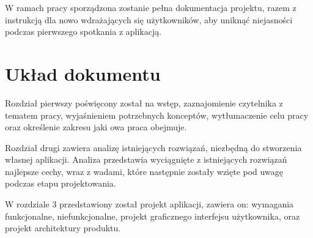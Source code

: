 W ramach pracy sporządzona zostanie pełna dokumentacja projektu, razem z instrukcją dla nowo wdrażających się użytkowników, aby uniknąć niejasności podczas pierwszego spotkania z aplikacją. 


\section{Układ dokumentu}
Rozdział pierwszy poświęcony został na wstęp, zaznajomienie czytelnika z tematem pracy, wyjaśnieniem potrzebnych konceptów, wytłumaczenie celu pracy oraz określenie zakresu jaki owa praca obejmuje. 

Rozdział drugi zawiera analizę istniejących rozwiązań, niezbędną do stworzenia własnej aplikacji. Analiza przedstawia wyciągnięte z istniejących rozwiązań najlepsze cechy, wraz z wadami, które następnie zostały wzięte pod uwagę podczas etapu projektowania.

W rozdziale 3 przedstawiony został projekt aplikacji, zawiera on: wymagania funkcjonalne, niefunkcjonalne, projekt graficznego interfejsu użytkownika, oraz projekt architektury produktu.

